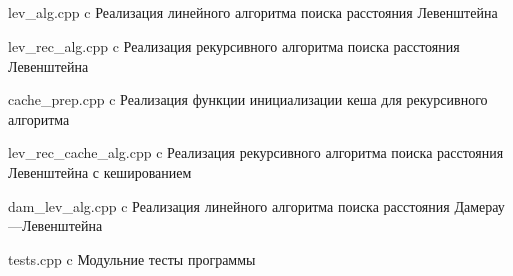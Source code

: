 \begin{appendices}
	\chapter{}
	{lev_alg.cpp}
	{c}
	{Реализация линейного алгоритма поиска расстояния Левенштейна}

	{lev_rec_alg.cpp}
	{c}
	{Реализация рекурсивного алгоритма поиска расстояния Левенштейна}
	
	{cache_prep.cpp}
	{c}
	{Реализация функции инициализации кеша для рекурсивного алгоритма}
	
	{lev_rec_cache_alg.cpp}
	{c}
	{Реализация рекурсивного алгоритма поиска расстояния Левенштейна с кешированием}
	
	{dam_lev_alg.cpp}
	{c}
	{Реализация линейного алгоритма поиска расстояния Дамерау---Левенштейна}
	
	{tests.cpp}
	{c}
	{Модульние тесты программы}
\end{appendices}
